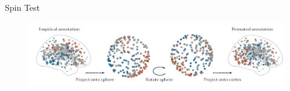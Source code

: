\documentclass{beamer}
\begin{document}
\begin{frame}{Spin Test}
	\begin{figure}[h]
		\centering
			\includegraphics[scale=0.5]{../Figures/fig_null_models_5.png}
	\end{figure}	
\end{frame}
\end{document}
